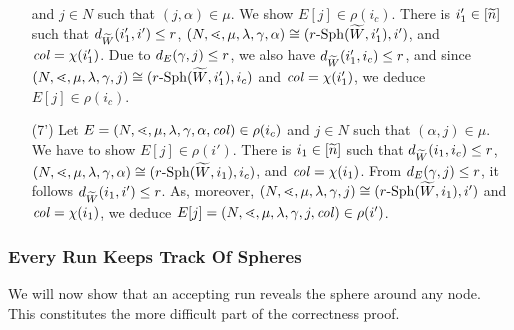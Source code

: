 \documentclass{LMCS}
\begin{document}
\begin{enumerate}[(1')]
  and $j \in N$ such that $(j,\alpha) \in \mu$. We show $E[j] \in \rho(i_c)$.
  There is $i_1' \in [\widetilde{n}]$ such that $d_{\widetilde{W}}(i_1',i') \le r$,
  $(N,\mathord{\lessdot},\mu,\lambda,\gamma,\alpha) \cong
  (r\text{-}\mathrm{Sph}({\widetilde{W}},i_1'),i')$, and $\mathit{col} = \chi(i_1')$. Due to
  $d_E(\gamma,j) \le r$, we also have $d_{\widetilde{W}}(i_1',i_c) \le r$, and
  since $(N,\mathord{\lessdot},\mu,\lambda,\gamma,j) \cong
  (r\text{-}\mathrm{Sph}({\widetilde{W}},i_1'),i_c)$ and $\mathit{col} = \chi(i_1')$, we deduce $E[j]
  \in \rho(i_c)$.
\item[(7')] Let $E=(N,\mathord{\lessdot},\mu,\lambda,\gamma,\alpha,\mathit{col}) \in \rho(i_c)$
  and $j \in N$ such that $(\alpha,j) \in \mu$. We have to show $E[j] \in
  \rho(i')$. There is $i_1 \in [\widetilde{n}]$ such that $d_{\widetilde{W}}(i_1,i_c) \le r$,
  $(N,\mathord{\lessdot},\mu,\lambda,\gamma,\alpha) \cong
  (r\text{-}\mathrm{Sph}({\widetilde{W}},i_1),i_c)$, and $\mathit{col} = \chi(i_1)$. From $d_E(\gamma,j)
  \le r$, it follows $d_{\widetilde{W}}(i_1,i') \le r$. As, moreover,
  $(N,\mathord{\lessdot},\mu,\lambda,\gamma,j) \cong (r\text{-}\mathrm{Sph}({\widetilde{W}},i_1),i')$ and
  $\mathit{col} = \chi(i_1)$, we deduce $E[j]=(N,\mathord{\lessdot},\mu,\lambda,\gamma,j,\mathit{col})
  \in \rho(i')$.
\end{enumerate}

\subsubsection{Every Run Keeps Track Of Spheres}\label{subsect:keepstrack}

We will now show that an accepting run reveals the sphere around any node.
This constitutes the more difficult part of the correctness proof.
\end{document}
